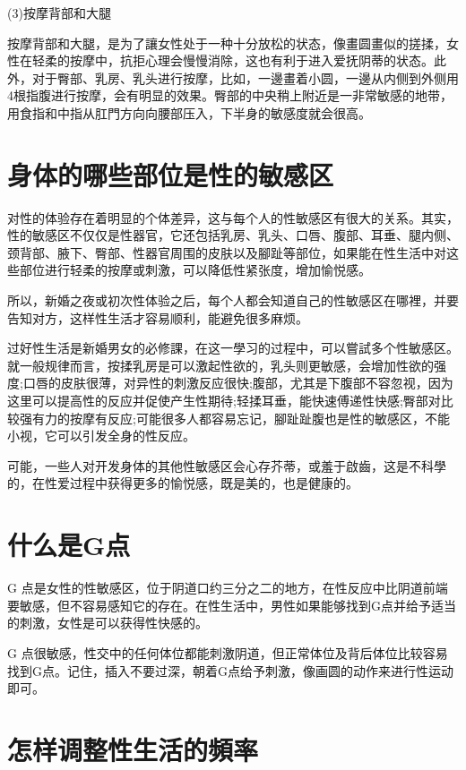 \documentclass[12pt,UTF8]{ctexbook}
\begin{document}
(3)按摩背部和大腿

按摩背部和大腿，是为了讓女性处于一种十分放松的状态，像畫圆畫似的搓揉，女性在轻柔的按摩中，抗拒心理会慢慢消除，这也有利于进入爱抚阴蒂的状态。此外，对于臀部、乳房、乳头进行按摩，比如，一邊畫着小圆，一邊从内侧到外侧用4根指腹进行按摩，会有明显的效果。臀部的中央稍上附近是一非常敏感的地带，用食指和中指从肛門方向向腰部压入，下半身的敏感度就会很高。

\section{身体的哪些部位是性的敏感区}

对性的体验存在着明显的个体差异，这与每个人的性敏感区有很大的关系。其实，性的敏感区不仅仅是性器官，它还包括乳房、乳头、口唇、腹部、耳垂、腿内侧、颈背部、腋下、臀部、性器官周围的皮肤以及腳趾等部位，如果能在性生活中对这些部位进行轻柔的按摩或刺激，可以降低性紧张度，增加愉悦感。

所以，新婚之夜或初次性体验之后，每个人都会知道自己的性敏感区在哪裡，并要告知对方，这样性生活才容易顺利，能避免很多麻烦。

过好性生活是新婚男女的必修課，在这一學习的过程中，可以嘗試多个性敏感区。就一般规律而言，按揉乳房是可以激起性欲的，乳头则更敏感，会增加性欲的强度;口唇的皮肤很薄，对异性的刺激反应很快;腹部，尤其是下腹部不容忽视，因为这里可以提高性的反应并促使产生性期待;轻揉耳垂，能快速傅递性快感;臀部对比较强有力的按摩有反应;可能很多人都容易忘记，腳趾趾腹也是性的敏感区，不能小视，它可以引发全身的性反应。

可能，一些人对开发身体的其他性敏感区会心存芥蒂，或羞于啟齒，这是不科學的，在性爱过程中获得更多的愉悦感，既是美的，也是健康的。

\section{什么是G点}

G 点是女性的性敏感区，位于阴道口约三分之二的地方，在性反应中比阴道前端要敏感，但不容易感知它的存在。在性生活中，男性如果能够找到G点并给予适当的刺激，女性是可以获得性快感的。

G 点很敏感，性交中的任何体位都能刺激阴道，但正常体位及背后体位比较容易找到G点。记住，插入不要过深，朝着G点给予刺激，像画圆的动作来进行性运动即可。

\section{怎样调整性生活的頻率}
\end{document}
